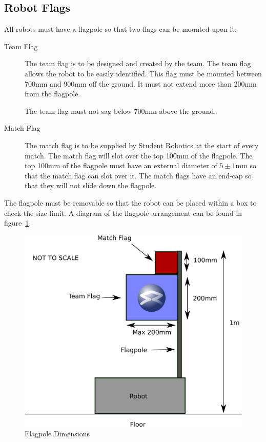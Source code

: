 \subsection{Robot Flags}
\label{sec:flags}
All robots must have a flagpole so that two flags can be mounted upon it:
\begin{description}
\item[Team Flag] The team flag is to be designed and created by the team.
 The team flag allows the robot to be easily identified.
 This flag must be mounted between 700mm and 900mm off the ground.
 It must not extend more than 200mm from the flagpole.

The team flag must not sag below 700mm above the ground.
\item[Match Flag] The match flag is to be supplied by Student Robotics at the start of every match.
 The match flag will slot over the top 100mm of the flagpole.
 The top 100mm of the flagpole must have an external diameter of $5\pm1$mm so that the match flag can slot over it.
 The match flags have an end-cap so that they will not slide down the flagpole.
\end{description}

The flagpole must be removable so that the robot can be placed within a box to check the size limit.
A diagram of the flagpole arrangement can be found in figure~\ref{fig:flag}.

\begin{figure}
\begin{center}
\includegraphics[keepaspectratio, scale =1]{./images/flag.png}
\caption{\label{fig:flag}Flagpole Dimensions}
\end{center}
\end{figure}
\clearpage
